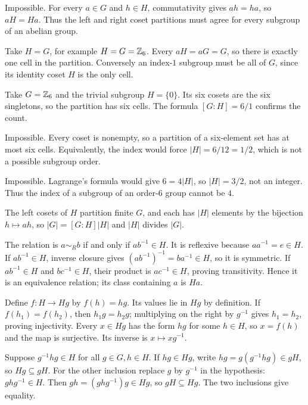 Impossible. For every $a\in G$ and $h\in H$, commutativity gives $ah=ha$, so $aH=Ha$. Thus the left and right coset partitions must agree for every subgroup of an abelian group.

Take $H=G$, for example $H=G=\mathbb{Z}_6$. Every $aH=aG=G$, so there is exactly one cell in the partition. Conversely an index-$1$ subgroup must be all of $G$, since its identity coset $H$ is the only cell.

Take $G=\mathbb{Z}_6$ and the trivial subgroup $H=\{0\}$. Its six cosets are the six singletons, so the partition has six cells. The formula $[G:H]=6/1$ confirms the count.

Impossible. Every coset is nonempty, so a partition of a six-element set has at most six cells. Equivalently, the index would force $|H|=6/12=1/2$, which is not a possible subgroup order.

Impossible. Lagrange's formula would give $6=4|H|$, so $|H|=3/2$, not an integer. Thus the index of a subgroup of an order-$6$ group cannot be $4$.

The left cosets of $H$ partition finite $G$, and each has $|H|$ elements by the bijection $h\mapsto ah$, so $|G|=[G:H]|H|$ and $|H|$ divides $|G|$.

The relation is $a\sim_R b$ if and only if $ab^{-1}\in H$.
It is reflexive because $aa^{-1}=e\in H$.
If $ab^{-1}\in H$, inverse closure gives $(ab^{-1})^{-1}=ba^{-1}\in H$, so it is symmetric.
If $ab^{-1}\in H$ and $bc^{-1}\in H$, their product is $ac^{-1}\in H$, proving transitivity. Hence it is an equivalence relation; its class containing $a$ is $Ha$.

Define $f:H\to Hg$ by $f(h)=hg$. Its values lie in $Hg$ by definition. If $f(h_1)=f(h_2)$, then $h_1g=h_2g$; multiplying on the right by $g^{-1}$ gives $h_1=h_2$, proving injectivity. Every $x\in Hg$ has the form $hg$ for some $h\in H$, so $x=f(h)$ and the map is surjective. Its inverse is $x\mapsto xg^{-1}$.

Suppose $g^{-1}hg\in H$ for all $g\in G,h\in H$. If $hg\in Hg$, write $hg=g(g^{-1}hg)\in gH$, so $Hg\subseteq gH$. For the other inclusion replace $g$ by $g^{-1}$ in the hypothesis: $ghg^{-1}\in H$. Then $gh=(ghg^{-1})g\in Hg$, so $gH\subseteq Hg$. The two inclusions give equality.

